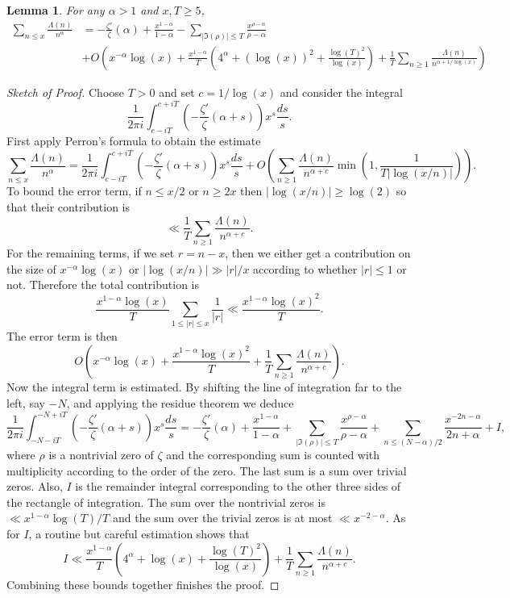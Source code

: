 \documentclass[12pt,reqno]{amsart}
\newtheorem{lemma}[theorem]{Lemma}
\theoremstyle{definition}
\numberwithin{equation}{section}
\begin{document}
    \begin{lemma}\label{lem:lemma_2}
        For any $\alpha > 1$ and $x,T \ge 5$,
        \begin{align*}
           \sum_{n \le x}\frac{\Lambda(n)}{n^{\alpha}} &= -\frac{\zeta'}{\zeta}(\alpha)+\frac{x^{1-\alpha}}{1-\alpha}-\sum_{|\Im(\rho)| \le T}\frac{x^{\rho-\alpha}}{\rho-\alpha} \\
           &+O\left(x^{-\alpha}\log(x)+\frac{x^{1-\alpha}}{T}\left(4^{\alpha}+(\log(x))^{2}+\frac{\log(T)^{2}}{\log(x)}\right)+\frac{1}{T}\sum_{n \ge 1}\frac{\Lambda(n)}{n^{\alpha+1/\log(x)}}\right)
        \end{align*}
    \end{lemma}
    \begin{proof}[Sketch of Proof]
        Choose $T > 0$ and set $c = 1/\log(x)$ and consider the integral
        \[
            \frac{1}{2\pi i}\int_{c-iT}^{c+iT}\left(-\frac{\zeta'}{\zeta}(\alpha+s)\right)x^{s}\frac{ds}{s}.
        \]
        First apply Perron's formula to obtain the estimate
        \[
            \sum_{n \le x}\frac{\Lambda(n)}{n^{\alpha}} = \frac{1}{2\pi i}\int_{c-iT}^{c+iT}\left(-\frac{\zeta'}{\zeta}(\alpha+s)\right)x^{s}\frac{ds}{s}+O\left(\sum_{n \ge 1}\frac{\Lambda(n)}{n^{\alpha+c}}\min\left(1,\frac{1}{T|\log(x/n)|}\right)\right).
        \]
        To bound the error term, if $n \le x/2$ or $n \ge 2x$ then $|\log(x/n)| \ge \log(2)$ so that their contribution is
        \[
          \ll \frac{1}{T}\sum_{n \ge 1}\frac{\Lambda(n)}{n^{\alpha+c}}.  
        \]
        For the remaining terms, if we set $r = n-x$, then we either get a contribution on the size of $x^{-\alpha}\log(x)$ or $|\log(x/n)| \gg |r|/x$ according to whether $|r| \le 1$ or not. Therefore the total contribution is
        \[
            \frac{x^{1-\alpha}\log(x)}{T}\sum_{1 \le |r| \le x}\frac{1}{|r|} \ll \frac{x^{1-\alpha}\log(x)^{2}}{T}.
        \]
        The error term is then
        \[
            O\left(x^{-\alpha}\log(x)+\frac{x^{1-\alpha}\log(x)^{2}}{T}+\frac{1}{T}\sum_{n \ge 1}\frac{\Lambda(n)}{n^{\alpha+c}}\right).
        \]
        Now the integral term is estimated. By shifting the line of integration far to the left, say $-N$, and applying the residue theorem we deduce
        \[
            \frac{1}{2\pi i}\int_{-N-iT}^{-N+iT}\left(-\frac{\zeta'}{\zeta}(\alpha+s)\right)x^{s}\frac{ds}{s} = -\frac{\zeta'}{\zeta}(\alpha)+\frac{x^{1-\alpha}}{1-\alpha}+\sum_{|\Im(\rho)| \le T}\frac{x^{\rho-\alpha}}{\rho-\alpha}+\sum_{n \le (N-\alpha)/2}\frac{x^{-2n-\alpha}}{2n+\alpha}+I,
        \]
        where $\rho$ is a nontrivial zero of $\zeta$ and the corresponding sum is counted with multiplicity according to the order of the zero. The last sum is a sum over trivial zeros. Also, $I$ is the remainder integral corresponding to the other three sides of the rectangle of integration. The sum over the nontrivial zeros is $\ll x^{1-\alpha}\log(T)/T$ and the sum over the trivial zeros is at most $\ll x^{-2-\alpha}$. As for $I$, a routine but careful estimation shows that
        \[
            I \ll \frac{x^{1-\alpha}}{T}\left(4^{\alpha}+\log(x)+\frac{\log(T)^{2}}{\log(x)}\right)+\frac{1}{T}\sum_{n \ge 1}\frac{\Lambda(n)}{n^{\alpha+c}}.
        \]
        Combining these bounds together finishes the proof.
    \end{proof}
\end{document}
